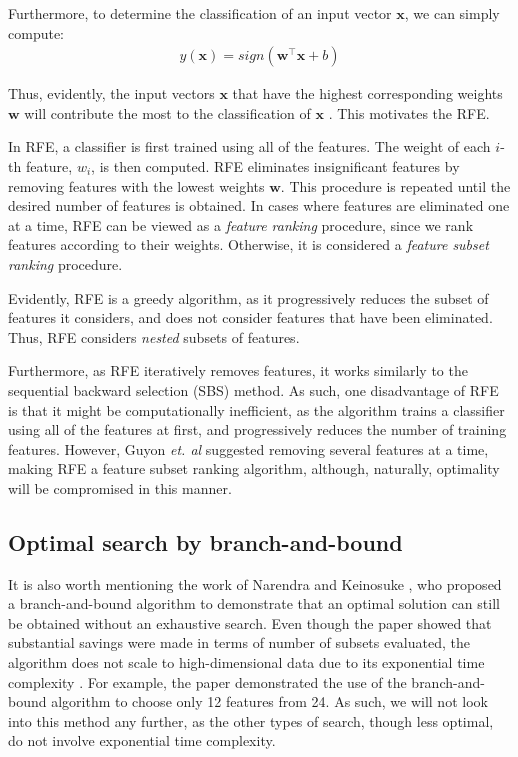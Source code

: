 \documentclass[12pt, twoside, a4paper]{report}
\def\vec{\boldsymbol}
\begin{document}
Furthermore, to determine the classification of an input vector $\vec{x}$, we can simply compute:
\begin{align*}
y(\vec{x}) = sign(\vec{w}^\top \vec{x} + b)
\end{align*}

Thus, evidently, the input vectors $\vec{x}$ that have the highest corresponding weights $\vec{w}$ will contribute the most to the classification of $\vec{x}$ \cite{RefWorks:229}. This motivates the RFE.

In RFE, a classifier is first trained using all of the features. The weight of each $i$-th feature, $w_i$, is then computed. RFE eliminates insignificant features by removing features with the lowest weights $\vec{w}$. This procedure is repeated until the desired number of features is obtained. In cases where features are eliminated one at a time, RFE can be viewed as a \textit{feature ranking} procedure, since we rank features according to their weights. Otherwise, it is considered a \textit{feature subset ranking} procedure.

Evidently, RFE is a greedy algorithm, as it progressively reduces the subset of features it considers, and does not consider features that have been eliminated. Thus, RFE considers \textit{nested} subsets of features.

Furthermore, as RFE iteratively removes features, it works similarly to the sequential backward selection (SBS) method. As such, one disadvantage of RFE is that it might be computationally inefficient, as the algorithm trains a classifier using all of the features at first, and progressively reduces the number of training features. However, Guyon \textit{et. al} suggested removing several features at a time, making RFE a feature subset ranking algorithm, although, naturally, optimality will be compromised in this manner.


\subsection{Optimal search by branch-and-bound}
It is also worth mentioning the work of Narendra and Keinosuke \cite{RefWorks:176}, who proposed a branch-and-bound algorithm to demonstrate that an optimal solution can still be obtained without an exhaustive search. Even though the paper showed that substantial savings were made in terms of number of subsets evaluated, the algorithm does not scale to high-dimensional data \cite{RefWorks:178} due to its exponential time complexity \cite{RefWorks:190, RefWorks:189}. For example, the paper demonstrated the use of the branch-and-bound algorithm to choose only 12 features from 24. As such, we will not look into this method any further, as the other types of search, though less optimal, do not involve exponential time complexity.
\end{document}
